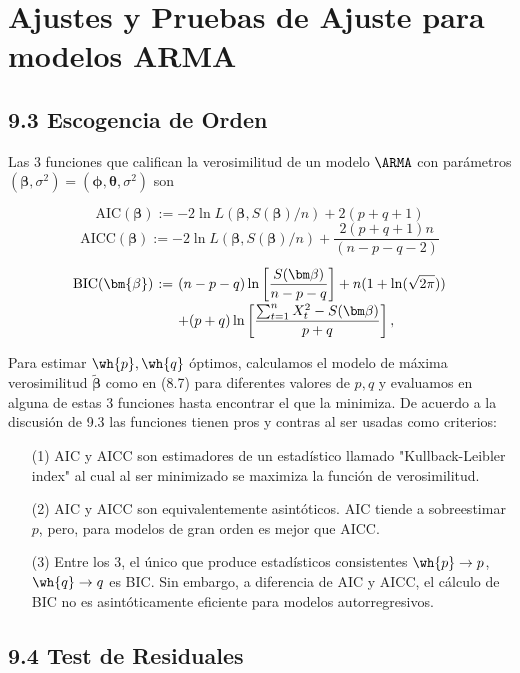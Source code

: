 
\section{Ajustes y Pruebas de Ajuste para modelos ARMA}

\subsection*{9.3 Escogencia de Orden}

Las 3 funciones que califican la verosimilitud de un modelo $\ARMA$ con parámetros $(\bm{\beta},\sigma^2) = (\bm{\phi},\bm{\theta},\sigma^2)$ son

\[ \mbox{AIC}(\bm{\beta}) := -2 \ln L(\bm{\beta}, S(\bm\beta)/n) + 2(p+q+1) \]
\[ \mbox{AICC}(\bm{\beta}) := -2 \ln L(\bm{\beta}, S(\bm\beta)/n) + \frac{2(p+q+1)n}{(n-p-q-2)} \]
\[ \everymath{\displaystyle}
\arraycolsep=1.8pt\def\arraystretch{2}
\begin{array}{rcl}
    \mbox{BIC}(\bm{\beta}) & := & (n-p-q) \ln\left[ \frac{S(\bm\beta)}{n-p-q} \right] + n(1+\ln(\sqrt{2\pi}))\\
    & & + (p+q) \ln\left[ \frac{\sum_{t = 1}^n X_t^2 - S(\bm\beta)}{p+q} \right],
\end{array} \]

Para estimar $\wh{p},\wh{q}$ óptimos, calculamos el modelo de máxima verosimilitud $\tilde{\bm\beta}$ como en (8.7) para diferentes valores de $p,q$ y evaluamos en alguna de estas 3 funciones hasta encontrar el que la minimiza. De acuerdo a la discusión de 9.3 las funciones tienen pros y contras al ser usadas como criterios:
\begin{itemize}
    \item[(1)] AIC y AICC son estimadores de un estadístico llamado "Kullback-Leibler index" al cual al ser minimizado se maximiza la función de verosimilitud.
    \item[(2)] AIC y AICC son equivalentemente asintóticos. AIC tiende a sobreestimar $p$, pero, para modelos de gran orden es mejor que AICC.
    \item[(3)] Entre los 3, el único que produce estadísticos consistentes $\wh{p} \to p$, $\wh{q}\to q$ es BIC. Sin embargo, a diferencia de AIC y AICC, el cálculo de BIC no es asintóticamente eficiente para modelos autorregresivos.
\end{itemize}

\subsection*{9.4 Test de Residuales}

